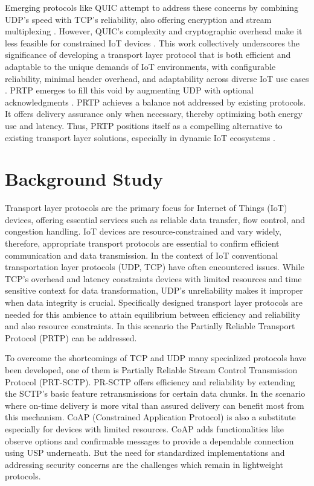 \documentclass[lettersize,journal]{IEEEtran}
\begin{document}
Emerging protocols like QUIC attempt to address these concerns by combining UDP’s speed with TCP’s reliability, also offering encryption and stream multiplexing \cite{Iyengar2021QUIC}. However, QUIC’s complexity and cryptographic overhead make it less feasible for constrained IoT devices \cite{Fernandez2021QUIC}.
This work collectively underscores the significance of developing a transport layer protocol that is both efficient and adaptable to the unique demands of IoT environments, with configurable reliability, minimal header overhead, and adaptability across diverse IoT use cases \cite{Liri2018Robustness}.
PRTP emerges to fill this void by augmenting UDP with optional acknowledgments \cite{Grinnemo2002PRTP}. PRTP achieves a balance not addressed by existing protocols. It offers delivery assurance only when necessary, thereby optimizing both energy use and latency. Thus, PRTP positions itself as a compelling alternative to existing transport layer solutions, especially in dynamic IoT ecosystems \cite{Grinnemo2002PRTP}.


\section{Background Study}
Transport layer protocols are the primary focus for Internet of Things (IoT) devices, offering essential services such as reliable data transfer, flow control, and congestion handling. IoT devices are resource-constrained and vary widely, therefore, appropriate transport protocols are essential to confirm efficient communication and data transmission. In the context of IoT conventional transportation layer protocols (UDP, TCP) have often encountered issues. While TCP's overhead and latency constraints devices with limited resources and time sensitive context for data transformation, UDP's unreliability makes it improper when data integrity is crucial. Specifically designed transport layer protocols are needed for this ambience to attain equilibrium between efficiency and reliability and also resource constraints. In this scenario the Partially Reliable Transport Protocol (PRTP) can be addressed.

To overcome the shortcomings of TCP and UDP many specialized protocols have been developed, one of them is Partially Reliable Stream Control Transmission Protocol (PRT-SCTP). PR-SCTP offers efficiency and reliability by extending the SCTP's basic feature retransmissions for certain data chunks. In the scenario where on-time delivery is more vital than assured delivery can benefit most from this mechanism. CoAP (Constrained Application Protocol) is also a substitute especially for devices with limited resources. CoAP adds functionalities like observe options and confirmable messages to provide a dependable connection using USP underneath. But the need for standardized implementations and addressing security concerns are the challenges which remain in lightweight protocols. 
\end{document}
